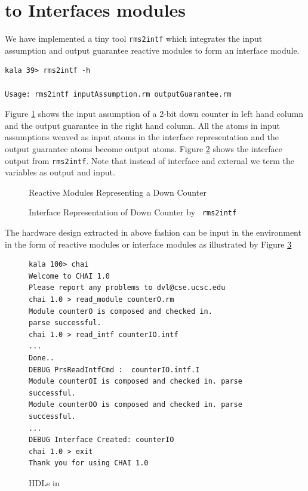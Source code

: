 \section{{\rm } to Interfaces modules}
We have implemented a tiny tool {\tt rms2intf} which integrates
the input assumption and output guarantee reactive modules to form
an interface module.

\begin{verbatim}
kala 39> rms2intf -h

Usage: rms2intf inputAssumption.rm outputGuarantee.rm
\end{verbatim}

Figure \ref{fig:counterrms} shows the input assumption of a 2-bit
down counter in left hand column and the output guarantee in the
right hand column. All the atoms in input assumptions weaved as
input atoms in the interface representation and the output
guarantee atoms become output atoms. Figure \ref{fig:counterintf}
shows the interface output from {\tt rms2intf}. Note that instead
of interface and external we term the variables as output and
input.

\begin{figure}

\hspace{4em}

\caption{Reactive Modules Representing a Down Counter}
\label{fig:counterrms}
\end{figure}

\begin{figure}
\centering

\caption{Interface Representation of Down Counter by {\tt
rms2intf}} \label{fig:counterintf}
\end{figure}

The hardware design extracted in above fashion can be input in the
{\chai } environment in the form of reactive modules or interface
modules as illustrated by Figure \ref{fig:chairmintf}

\begin{figure}
\begin{verbatim}
kala 100> chai
Welcome to CHAI 1.0
Please report any problems to dvl@cse.ucsc.edu
chai 1.0 > read_module counterO.rm
Module counterO is composed and checked in.
parse successful.
chai 1.0 > read_intf counterIO.intf
...
Done..
DEBUG PrsReadIntfCmd :  counterIO.intf.I
Module counterOI is composed and checked in. parse successful.
Module counterOO is composed and checked in. parse successful.
...
DEBUG Interface Created: counterIO
chai 1.0 > exit
Thank you for using CHAI 1.0
\end{verbatim}
\caption{ HDLs in {\chai}}
\label{fig:chairmintf}
\end{figure}
